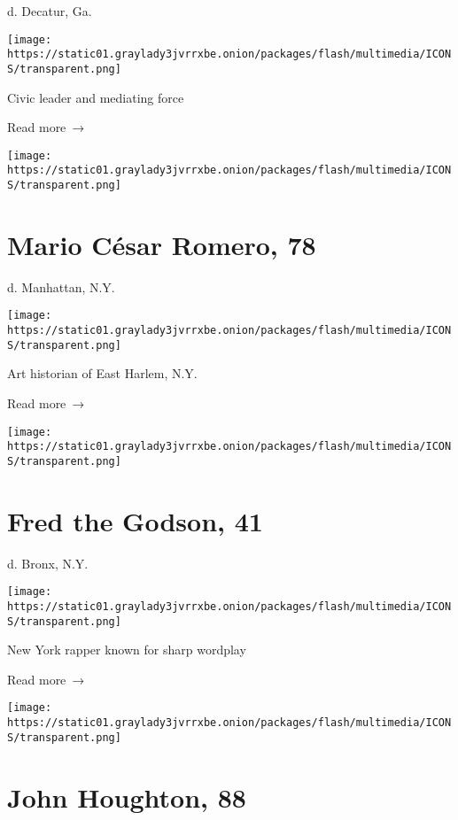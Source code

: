 d. Decatur, Ga.

\texttt{[image: https://static01.graylady3jvrrxbe.onion/packages/flash/multimedia/ICONS/transparent.png]}

Civic leader and mediating force

 Read more~→

\href{https://www.nytimes3xbfgragh.onion/2020/04/24/obituaries/mario-cesar-romero-dead-coronavirus.html}{}

\texttt{[image: https://static01.graylady3jvrrxbe.onion/packages/flash/multimedia/ICONS/transparent.png]}

\hypertarget{mario-cuxe9sar-romero-78}{%
\section{Mario César Romero, 78}\label{mario-cuxe9sar-romero-78}}

d. Manhattan, N.Y.

\texttt{[image: https://static01.graylady3jvrrxbe.onion/packages/flash/multimedia/ICONS/transparent.png]}

Art historian of East Harlem, N.Y.

 Read more~→

\href{https://www.nytimes3xbfgragh.onion/2020/04/24/arts/music/fred-the-godson-dead-coronavirus.html}{}

\texttt{[image: https://static01.graylady3jvrrxbe.onion/packages/flash/multimedia/ICONS/transparent.png]}

\hypertarget{fred-the-godson-41}{%
\section{Fred the Godson, 41}\label{fred-the-godson-41}}

d. Bronx, N.Y.

\texttt{[image: https://static01.graylady3jvrrxbe.onion/packages/flash/multimedia/ICONS/transparent.png]}

New York rapper known for sharp wordplay

 Read more~→

\href{https://www.nytimes3xbfgragh.onion/2020/04/23/climate/John-Houghton-dead-coronavirus.html}{}

\texttt{[image: https://static01.graylady3jvrrxbe.onion/packages/flash/multimedia/ICONS/transparent.png]}

\hypertarget{john-houghton-88}{%
\section{John Houghton, 88}\label{john-houghton-88}}


